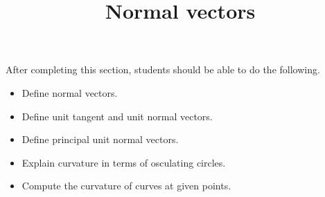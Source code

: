 \documentclass{ximera}
\title{Normal vectors}
\begin{document}
\begin{abstract}
\end{abstract}

\maketitle

\begin{sectionOutcomes}

After completing this section, students should be able to do the following.

\begin{itemize}
\item Define normal vectors.
\item Define unit tangent and unit normal vectors. 
\item Define principal unit normal vectors.
\item Explain curvature in terms of osculating circles. 
\item Compute the curvature of curves at given points.
\end{itemize}

\end{sectionOutcomes}
\end{document}
